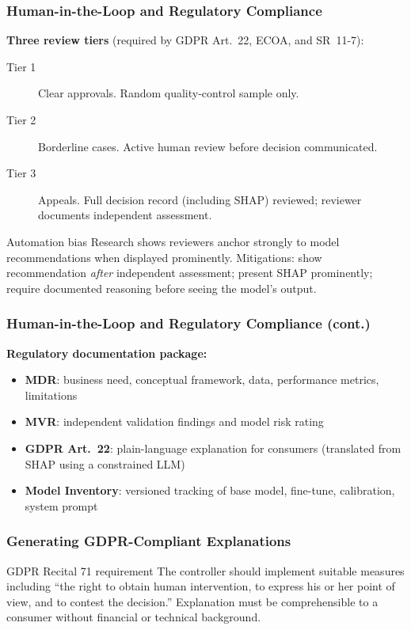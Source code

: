 \documentclass[9pt,t]{beamer}
\begin{document}
\begin{frame}
\frametitle{Human-in-the-Loop and Regulatory Compliance}

\textbf{Three review tiers} (required by GDPR Art.~22, ECOA, and SR~11-7):
\begin{description}
  \item[Tier 1] Clear approvals. Random quality-control sample only.
  \item[Tier 2] Borderline cases. Active human review before decision communicated.
  \item[Tier 3] Appeals. Full decision record (including SHAP) reviewed; reviewer documents independent assessment.
\end{description}

\medskip
\begin{alertblock}{Automation bias}
  Research shows reviewers anchor strongly to model recommendations when displayed prominently.
  Mitigations: show recommendation \emph{after} independent assessment; present SHAP prominently;
  require documented reasoning before seeing the model's output.
\end{alertblock}
\end{frame}

\begin{frame}
\frametitle{Human-in-the-Loop and Regulatory Compliance (cont.)}

\textbf{Regulatory documentation package:}
\begin{itemize}
  \item \textbf{MDR}: business need, conceptual framework, data, performance metrics, limitations
  \item \textbf{MVR}: independent validation findings and model risk rating
  \item \textbf{GDPR Art.~22}: plain-language explanation for consumers (translated from SHAP using a constrained LLM)
  \item \textbf{Model Inventory}: versioned tracking of base model, fine-tune, calibration, system prompt
\end{itemize}
\end{frame}

\begin{frame}
\frametitle{Generating GDPR-Compliant Explanations}

\begin{block}{GDPR Recital 71 requirement}
  The controller should implement suitable measures including ``the right to obtain human
  intervention, to express his or her point of view, and to contest the decision.''
  Explanation must be comprehensible to a consumer without financial or technical background.
\end{block}
\end{frame}
\end{document}
